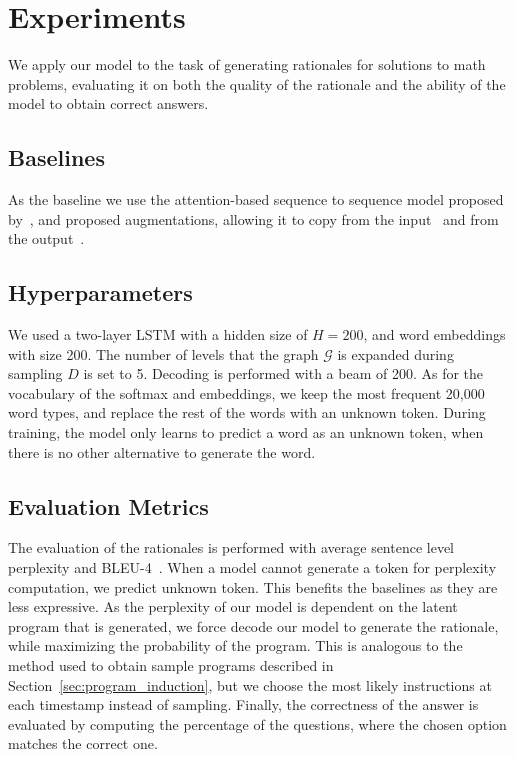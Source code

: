\section{Experiments}
\label{sec:exp}
We apply our model to the task of generating rationales for solutions to math problems, evaluating it on both the quality of the rationale and the ability of the model to obtain correct answers. 

\subsection{Baselines}
As the baseline we use the attention-based sequence to sequence model proposed by~, and proposed augmentations, allowing it to copy from the input~\cite{DBLP:journals/corr/LingGHKSWB16} and from the output~\cite{DBLP:journals/corr/MerityXBS16}.

\subsection{Hyperparameters}
We used a two-layer LSTM with a hidden size of $H=200$, and word embeddings with size 200. The number of levels that the graph $\mathcal{G}$ is expanded during sampling $D$ is set to 5. Decoding is performed with a beam of 200. As for the vocabulary of the softmax and embeddings, we keep the most frequent 20,000 word types, and replace the rest of the words with an unknown token. During training, the model only learns to predict a word as an unknown token, when there is no other alternative to generate the word.

\subsection{Evaluation Metrics}

The evaluation of the rationales is performed with average sentence level perplexity and BLEU-4~\cite{Papineni:2002:BMA:1073083.1073135}. When a model cannot generate a token for perplexity computation, we predict unknown token. This benefits the baselines as they are less expressive. As the perplexity of our model is dependent on the latent program that is generated, we force decode our model to generate the rationale, while maximizing the probability of the program. This is analogous to the method used to obtain sample programs described in Section~\ref{sec:program_induction}, but we choose the most likely instructions at each timestamp instead of sampling. Finally, the correctness of the answer is evaluated by computing the percentage of the questions, where the chosen option matches the correct one.

